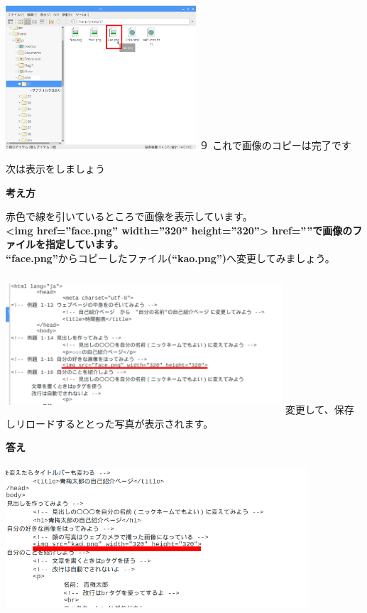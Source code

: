 \documentclass[a4paper,12pt]{jarticle}
\begin{document}
\bigskip

\bigskip

\begin{minipage}{7.559cm}
  \includegraphics[width=7.087cm,height=5.332cm]{textbook-img170.png}
  \newline
  ９ これで画像のコピーは完了です

  次は表示をしましょう
\end{minipage}


\clearpage
\flushleft
\textbf{考え方}\ \


赤色で線を引いているところで画像を表示しています。\\
\textbf{{\textless}img href=”face.png” width=”320” height=”320”{\textgreater}}
\textbf{href=””で画像のファイルを指定しています。}\\
\textbf{“face.png”}からコピーしたファイル\textbf{(“kao.png”)}へ変更してみましょう。

\begin{minipage}{16.576cm}
  \includegraphics[width=10.296cm,height=5.145cm]{textbook-img171.png}
  \newline
  変更して、保存しリロードするととった写真が表示されます。
\end{minipage}

\flushleft
\textbf{答え}

\includegraphics[width=11.255cm,height=5.482cm]{textbook-img172.png}
\end{document}
